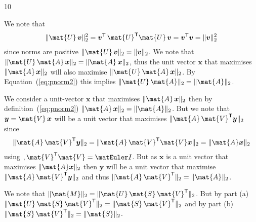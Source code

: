 \documentclass{sotonExamBoxes}    %
\begin{document}
\begin{question}{10}
  \begin{qparts}
    \begin{answer}
      We note that
      \begin{align*}
        \len{\mat{U}\,\bm{v}}_2^2 = \bm{v}^\tr \,\mat{U}^\tr
        \mat{U}\,\bm{v} = \bm{v}^\tr\bm{v} = \len{\bm{v}}_2^2
      \end{align*}
      since norms are positive $\len{\mat{U}\,\bm{v}}_2 =
      \len{\bm{v}}_2$.
      We note that  $\len{\mat{U}\,\mat{A}\,\bm{x}}_2 =
      \len{\mat{A}\,\bm{x}}_2$, thus the unit vector $\bm{x}$ that
      maximises $\len{\mat{A}\,\bm{x}}_2$ will also maximise
      $\len{\mat{U}\,\mat{A}\,\bm{x}}_2 $.  By
      Equation~(\ref{eq:pnorm2}) this implies $\len{\mat{U}\,\mat{A}}_2 =
      \len{\mat{A}}_2$.
    \end{answer}
    \begin{answer}
      We consider a unit-vector $\bm{x}$ that maximises
      $\len{\mat{A}\,\bm{x}}_2$ then by definition~(\ref{eq:pnorm2})
      $\len{\mat{A}\,\bm{x}}_2 = \len{\mat{A}}_2$.  But we note that
      $\bm{y}=\mat{V}\,\bm{x}$ will be a unit vector that maximises
      $\len{\mat{A}\,\mat{V}^\tr\bm{y}}_2$ since
      \begin{align*}
        \len{\mat{A}\,\mat{V}^\tr\bm{y}}_2 =
        \len{\mat{A}\,\mat{V}^\tr\mat{V}\bm{x}}_2 =
        \len{\mat{A}\bm{x}}_2
      \end{align*}
      using $,\mat{V}^\tr\mat{V}=\Id$.  But as $\bm{x}$ is a
      unit vector that maximises $ \len{\mat{A}\bm{x}}_2$ then
      $\bm{y}$ will be a unit vector that maximise
      $\len{\mat{A}\,\mat{V}^\tr\bm{y}}_2 $ and thus
      $\len{\mat{A}\,\mat{V}^\tr}_2=\len{\mat{A}}_2$.
    \end{answer}
    \begin{answer}
      We note that $\len{\mat{M}}_2 =
      \len{\mat{U}\,\mat{S}\,\mat{V}^\tr}_2$.  But by part (a)
      $\len{\mat{U}\,\mat{S}\,\mat{V}^\tr}_2=\len{\mat{S}\,\mat{V}^\tr}_2$
      and by part (b) $\len{\mat{S}\,\mat{V}^\tr}_2=\len{\mat{S}}_2$.

\end{answer}
\end{qparts}
\end{question}
\end{document}
